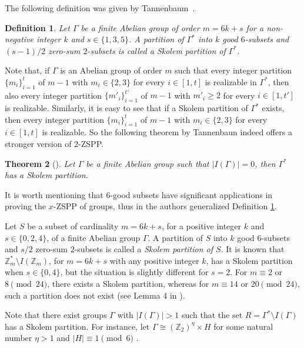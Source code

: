 \documentclass{article}
\newcommand{\zet}{\mathbb{Z}}
\newtheorem{thm}{Theorem}[section]
\newtheorem{dfn}[thm]{Definition}
\begin{document}

 The following definition was given by Tannenbaum~\cite{Tannenbaum1}.

\begin{dfn}\label{dfn:skolem}Let $\Gamma$ be a finite Abelian group of order $m=6k+s$ for a non-negative integer $k$ and $s\in\{1,3,5\}$. A partition of $\Gamma^*$ into $k$ good $6$-subsets and $(s-1)/2$ zero-sum $2$-subsets is called a {\em Skolem partition of $\Gamma^*$}.
\end{dfn}

Note that, if $\Gamma$ is an Abelian group of order $m$ such that every integer partition $\{m_i\}_{i=1}^t$ of $m-1$ with $m_i \in \{2, 3\}$ for every $i\in[1,t]$ is realizable in $\Gamma^*$, then also every integer partition $\{m'_i\}_{i=1}^{t'}$ of $m-1$ with $m'_i \geq 2$ for every $i\in[1,t']$ is realizable. Similarly, it is easy to see that if a Skolem partition of $\Gamma^*$ exists, then every integer partition $\{m_i\}_{i=1}^t$ of $m-1$ with $m_i \in \{2, 3\}$ for every $i\in[1,t]$ is realizable. So the following theorem by Tannenbaun indeed offers a stronger version of $2$-ZSPP.

\begin{thm}[\cite{Tannenbaum1}]\label{Tannenbaum1}Let $\Gamma$ be a finite Abelian group such that $|I(\Gamma)|=0$, then $\Gamma^*$ has a Skolem partition. 
\end{thm}

It is worth mentioning that 6-good subsets have significant applications in proving the $x$-ZSPP \cite{CicrSuch,CicrSuch2,CicTuz,Zeng} of groups, thus 
in \cite{CicrSuch2} the authors generalized  Definition \ref{dfn:skolem}. 

Let $S$ be a subset of cardinality $m=6k+s$, for a positive integer $k$ and $s\in\{0,2,4\}$, of a finite Abelian group $\Gamma$. A partition of $S$ into $k$ good $6$-subsets and $s/2$ zero-sum $2$-subsets is called a {\em Skolem partition of $S$}. It is known that $\zet_m^*\setminus I(\zet_m)${, for $m=6k+s$ with any positive integer $k$,} has a Skolem partition when $s\in\{0,4\}$, but the situation is slightly different for $s=2$. For $m\equiv 2$ or $8\pmod{24}$, there exists a Skolem partition, whereas for $m\equiv 14$ or $20\pmod{24}$, such a partition does not exist (see Lemma 4 in \cite{Tannenbaum1}). 


Note that there exist groups $\Gamma$ with $|I(\Gamma)|>1$ such that the set $R =\Gamma^* \setminus I(\Gamma)$ has a Skolem partition. For instance, let $\Gamma\cong(\zet_2)^{\eta}\times H$  for some natural number $\eta>1$ and $|H|\equiv 1\pmod 6$ \cite{CicrSuch2}.
\end{document}
